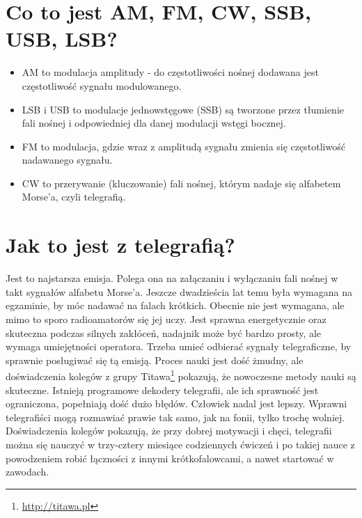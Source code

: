 \documentclass[a4paper,12pt]{article}
\begin{document}
\section{Co to jest AM, FM, CW, SSB, USB, LSB?}
\begin{itemize}
\item AM to modulacja amplitudy - do częstotliwości nośnej dodawana jest częstotliwość sygnału modulowanego. 
\item LSB i USB to modulacje jednowstęgowe (SSB) są tworzone przez tłumienie fali nośnej i odpowiedniej dla danej modulacji wstęgi bocznej. 
\item FM to modulacja, gdzie wraz z amplitudą sygnału zmienia się częstotliwość nadawanego sygnału. 
\item CW to przerywanie (kluczowanie) fali nośnej, którym nadaje się alfabetem Morse'a, czyli telegrafią. \end{itemize}

\section{Jak to jest z telegrafią?}
Jest to najstarsza emisja. Polega ona na załączaniu i wyłączaniu fali nośnej w takt sygnałów alfabetu Morse'a. Jeszcze dwadzieścia lat temu była wymagana na egzaminie, by móc nadawać na falach krótkich. Obecnie nie jest wymagana, ale mimo to sporo radioamatorów się jej uczy. Jest sprawna energetycznie oraz skuteczna podczas silnych zakłóceń, nadajnik może być bardzo prosty, ale wymaga umiejętności operatora. Trzeba umieć odbierać sygnały telegraficzne, by sprawnie posługiwać się tą emisją. Proces nauki jest dość żmudny, ale doświadczenia kolegów z grupy Titawa\footnote{\url{http://titawa.pl}} pokazują, że nowoczesne metody nauki są skuteczne. Istnieją programowe dekodery telegrafii, ale ich sprawność jest ograniczona, popełniają dość dużo błędów. Człowiek nadal jest lepszy. Wprawni telegrafiści mogą rozmawiać prawie tak samo, jak na fonii, tylko trochę wolniej. Doświadczenia kolegów pokazują, że przy dobrej motywacji i chęci, telegrafii można się nauczyć w trzy-cztery miesiące codziennych ćwiczeń i po takiej nauce z powodzeniem robić łączności z innymi krótkofalowcami, a nawet startować w zawodach.
\end{document}
